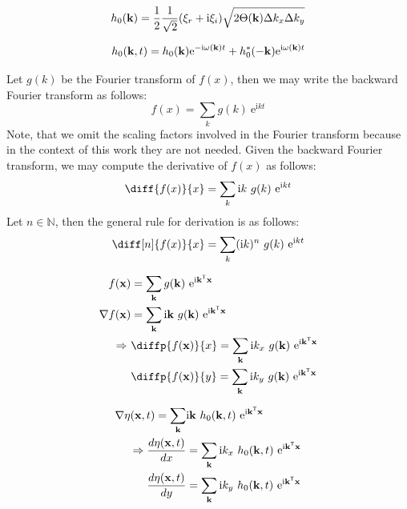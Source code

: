 \begin{equation}
h_0(\mathbf{k}) =
\frac{1}{2}
\frac{1}{\sqrt{2}}(\xi_r+\mathrm{i}\xi_i)
\sqrt{2\Theta(\mathbf{k})\Delta k_x \Delta k_y}
\end{equation}

\begin{equation}
 h_0(\mathbf{k}, t) =
 h_0(\mathbf{k})\mathrm{e}^{-\mathrm{i}\omega(\mathbf{k})t}
 + h_0^\ast(\mathbf{-k})\mathrm{e}^{\mathrm{i}\omega(\mathbf{k})t}
\end{equation}

Let $g(k)$ be the Fourier transform of $f(x)$, then we may write the
backward Fourier transform as follows:
\begin{equation}
 f(x) = \sum_{k}g(k)~\mathrm{e}^{\mathrm{i}kt}
\end{equation}
Note, that we omit the scaling factors involved in the Fourier transform
because in the context of this work they are not needed.
Given the backward Fourier transform, we may compute the derivative of $f(x)$
as follows:
\begin{equation}
  \diff{f(x)}{x} = \sum_{k}\mathrm{i}k~g(k)~\mathrm{e}^{\mathrm{i}kt}
\end{equation}
Let $n \in \mathbb{N}$, then the general rule for derivation is as follows:
\begin{equation}
  \diff[n]{f(x)}{x} = \sum_{k}(\mathrm{i}k)^n~g(k)~\mathrm{e}^{\mathrm{i}kt}
\end{equation}


\begin{align}
 f(\mvec{x}) &= \sum_{\mvec{k}}g(\mvec{k})~\mathrm{e}^{\mathrm{i}\transpose{\mvec{k}}\mvec{x}} \\
 \nabla f(\mvec{x}) &= \sum_{\mvec{k}}\mathrm{i}\mvec{k}~g(\mvec{k})~\mathrm{e}^{\mathrm{i}\transpose{\mvec{k}}\mvec{x}} \\
 \Rightarrow~&\diffp{f(\mvec{x})}{x} = \sum_{\mvec{k}}\mathrm{i}k_{x}~g(\mvec{k})~\mathrm{e}^{\mathrm{i}\transpose{\mvec{k}}\mvec{x}} \\
 &\diffp{f(\mvec{x})}{y} = \sum_{\mvec{k}}\mathrm{i}k_{y}~g(\mvec{k})~\mathrm{e}^{\mathrm{i}\transpose{\mvec{k}}\mvec{x}}
\end{align}

\begin{align}
\nabla\eta(\mathbf{x},t) =
\sum_{\mathbf{k}}&\mathrm{i}\mathbf{k}~h_0(\mathbf{k},t)
~\mathrm{e}^{\mathrm{i}\mathbf{k}^{\mathsf{T}}\mathbf{x}} \\
\Rightarrow \frac{d\eta(\mathbf{x},t)}{dx} &=
\sum_{\mathbf{k}}\mathrm{i}k_x~h_0(\mathbf{k},t)
~\mathrm{e}^{\mathrm{i}\mathbf{k}^{\mathsf{T}}\mathbf{x}} \\
\frac{d\eta(\mathbf{x},t)}{dy} &=
\sum_{\mathbf{k}}\mathrm{i}k_y~h_0(\mathbf{k},t)
~\mathrm{e}^{\mathrm{i}\mathbf{k}^{\mathsf{T}}\mathbf{x}}
\end{align}

